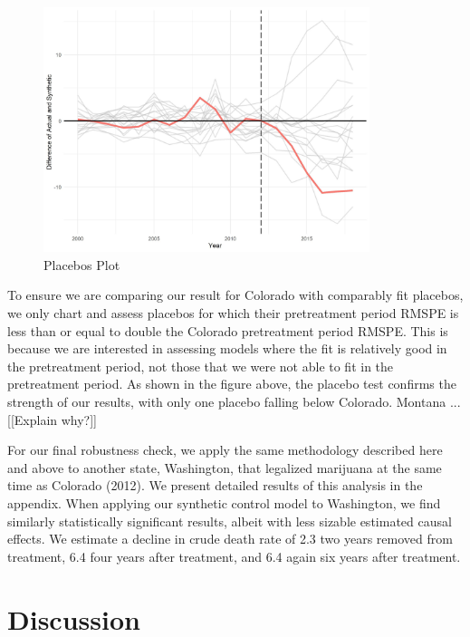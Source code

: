 \documentclass{article}
\begin{document}
\begin{figure}[H]
	\begin{center}
		\includegraphics[width=0.85\textwidth]{placebos_plot_colorado}
	\end{center}
	\caption{Placebos Plot}
	\label{fig:placebos_plot_colorado}
\end{figure}

To ensure we are comparing our result for Colorado with comparably fit placebos, we only chart and assess placebos for which their pretreatment period RMSPE is less than or equal to double the Colorado pretreatment period RMSPE. This is because we are interested in assessing models where the fit is relatively good in the pretreatment period, not those that we were not able to fit in the pretreatment period. As shown in the figure above, the placebo test confirms the strength of our results, with only one placebo falling below Colorado.  Montana ... [[Explain why?]]

For our final robustness check, we apply the same methodology described here and above to another state, Washington, that legalized marijuana at the same time as Colorado (2012). We present detailed results of this analysis in the appendix. When applying our synthetic control model to Washington, we find similarly statistically significant results, albeit with less sizable estimated causal effects. We estimate a decline in crude death rate of 2.3 two years removed from treatment, 6.4 four years after treatment, and 6.4 again six years after treatment.

\section{Discussion}
\end{document}
